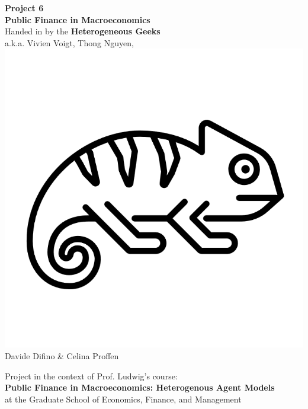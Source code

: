 \documentclass[12pt,a4paper,xcolor=dvipsnames]{article}
\begin{document}
\begin{center}
       \vspace*{4cm}
       \huge\textbf{Project 6} \\
       \vspace{0.4cm}
       \large \textbf{Public Finance in Macroeconomics} \\
       \vspace{0.5cm}
        \large Handed in by the \textcolor{	RubineRed}{\textbf{Heterogeneous Geeks}} \\
        \vspace{0.3cm}
        a.k.a. Vivien Voigt, Thong Nguyen, \includegraphics[scale=0.06]{geek.png}\\Davide Difino \& Celina Proffen \\
       \vspace{1.5cm}
       \vfill



        Project in the context of Prof. Ludwig's course: \\
        \textbf{Public Finance in Macroeconomics: Heterogenous Agent Models}\\
        at the Graduate School of Economics, Finance, and Management
       \vspace{0.8cm}
   \end{center}
\end{document}
